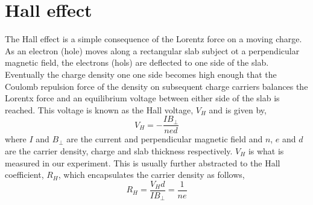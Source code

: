 
\section{Hall effect}

The Hall effect is a simple consequence of the Lorentz force on a moving charge. As an electron (hole) moves along a rectangular slab subject ot a perpendicular magnetic field, the electrons (hols) are deflected to one side of the slab. Eventually the charge density one one side becomes high enough that the Coulomb repulsion force of the density on subsequent charge carriers balances the Lorentx force and an equilibrium voltage between either side of the slab is reached. This voltage is known as the Hall voltage, $V_H$ and is given by,
\begin{equation}
    V_H = -\frac{IB_{\perp}}{ned}
\end{equation}
where $I$ and $B_{\perp}$ are the current and perpendicular magnetic field and $n$, $e$ and $d$ are the carrier density, charge and slab thickness respectively. $V_H$ is what is measured in our experiment. This is usually further abstracted to the Hall coefficient, $R_H$, which encapsulates the carrier density as follows,
\begin{equation}
    R_H = \frac{V_H d}{IB_\perp} = \frac{1}{ne}
\end{equation}

